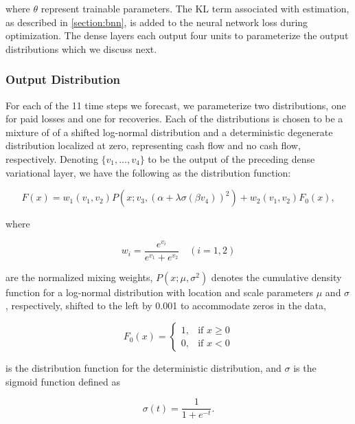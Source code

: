 \documentclass{article}
\begin{document}
where $\theta$ represent trainable parameters. The KL term associated with estimation, as described in \ref{section:bnn}, is added to the neural network loss during optimization. The dense layers each output four units to parameterize the output distributions which we discuss next.

\subsubsection{Output Distribution}

For each of the 11 time steps we forecast, we parameterize two distributions, one for paid losses and one for recoveries. Each of the distributions is chosen to be a mixture of of a shifted log-normal distribution and a deterministic degenerate distribution localized at zero, representing cash flow and no cash flow, respectively. Denoting $\{v_1,\dots,v_4\}$ to be the output of the preceding dense variational layer, we have the following as the distribution function:

\begin{equation} \label{eq:fx}
    F(x) = w_1(v_1, v_2)P(x; v_3, (\alpha + \lambda\sigma(\beta v_4))^2) + w_2(v_1, v_2)F_0(x),
\end{equation}

where 

\begin{equation}
    w_i = \frac{e^{v_i}}{e^{v_1} + e^{v_2}}\quad (i = 1, 2)
\end{equation}

are the normalized mixing weights, $P(x; \mu, \sigma^2)$ denotes the cumulative density function for a log-normal distribution with location and scale parameters $\mu$ and $\sigma$, respectively, shifted to the left by 0.001 to accommodate zeros in the data,

\begin{equation}
    F_{0}(x)=\left\{\begin{matrix} 1, & \mbox{if }x\ge 0 \\ 0, & \mbox{if }x<0 \end{matrix}\right.
\end{equation}

is the distribution function for the deterministic distribution, and $\sigma$ is the sigmoid function defined as

\begin{equation}
    \sigma(t) = \frac{1}{1 + e^{-t}}.
\end{equation}
\end{document}
